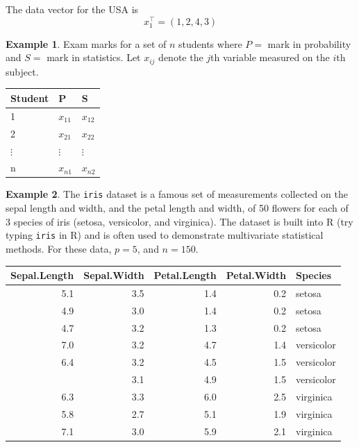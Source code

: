 \documentclass[]{book}
\theoremstyle{definition}
\theoremstyle{definition}
\newtheorem{example}{Example}[chapter]
\theoremstyle{definition}
\theoremstyle{remark}
\begin{document}
The data vector for the USA is
\[x_1^\top=(1,2,4,3)\]

\begin{example}
\protect\hypertarget{exm:exam}{}{\label{exm:exam} }Exam marks for a set of \(n\) students where \(P =\) mark in probability and \(S =\) mark in statistics.
Let \(x_{ij}\) denote the \(j\)th variable measured on the \(i\)th subject.
\end{example}

\begin{table}[H]
\centering
\begin{tabular}{lll}
\toprule
Student & P & S\\
\midrule
1 & $x_{11}$ & $x_{12}$\\
2 & $x_{21}$ & $x_{22}$\\
$\vdots$ & $\vdots$ & $\vdots$\\
n & $x_{n1}$ & $x_{n2}$\\
\bottomrule
\end{tabular}
\end{table}

\begin{example}
\protect\hypertarget{exm:iris}{}{\label{exm:iris} }The \texttt{iris} dataset is a famous set of measurements collected on the sepal length and width, and the petal length and width, of 50 flowers for each of 3 species of iris (setosa, versicolor, and virginica). The dataset is built into R (try typing \texttt{iris} in R) and is often used to demonstrate multivariate statistical methods. For these data, \(p=5\), and \(n=150\).
\end{example}

\begin{table}[H]
\centering
\begin{tabular}{rrrrl}
\toprule
Sepal.Length & Sepal.Width & Petal.Length & Petal.Width & Species\\
\midrule
5.1 & 3.5 & 1.4 & 0.2 & setosa\\
4.9 & 3.0 & 1.4 & 0.2 & setosa\\
4.7 & 3.2 & 1.3 & 0.2 & setosa\\
7.0 & 3.2 & 4.7 & 1.4 & versicolor\\
6.4 & 3.2 & 4.5 & 1.5 & versicolor\\
\addlinespace
6.9 & 3.1 & 4.9 & 1.5 & versicolor\\
6.3 & 3.3 & 6.0 & 2.5 & virginica\\
5.8 & 2.7 & 5.1 & 1.9 & virginica\\
7.1 & 3.0 & 5.9 & 2.1 & virginica\\
\bottomrule
\end{tabular}
\end{table}
\end{document}
